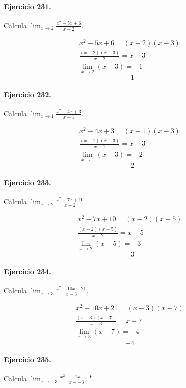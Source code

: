 \documentclass[11pt,a4paper]{article}
\begin{document}
\paragraph{Ejercicio 231.} Calcula $\displaystyle\lim_{x\to 2}\frac{x^2-5x+6}{x-2}$. 

\[
\begin{aligned}
x^2-5x+6=(x-2)(x-3)\\
\frac{(x-2)(x-3)}{x-2}=x-3\\
\lim_{x\to 2}(x-3)=-1
\end{aligned}
\]
\[\boxed{-1}\]


\paragraph{Ejercicio 232.} Calcula $\displaystyle\lim_{x\to 1}\frac{x^2-4x+3}{x-1}$. 

\[
\begin{aligned}
x^2-4x+3=(x-1)(x-3)\\
\frac{(x-1)(x-3)}{x-1}=x-3\\
\lim_{x\to 1}(x-3)=-2
\end{aligned}
\]
\[\boxed{-2}\]


\paragraph{Ejercicio 233.} Calcula $\displaystyle\lim_{x\to 2}\frac{x^2-7x+10}{x-2}$. 

\[
\begin{aligned}
x^2-7x+10=(x-2)(x-5)\\
\frac{(x-2)(x-5)}{x-2}=x-5\\
\lim_{x\to 2}(x-5)=-3
\end{aligned}
\]
\[\boxed{-3}\]


\paragraph{Ejercicio 234.} Calcula $\displaystyle\lim_{x\to 3}\frac{x^2-10x+21}{x-3}$. 

\[
\begin{aligned}
x^2-10x+21=(x-3)(x-7)\\
\frac{(x-3)(x-7)}{x-3}=x-7\\
\lim_{x\to 3}(x-7)=-4
\end{aligned}
\]
\[\boxed{-4}\]


\paragraph{Ejercicio 235.} Calcula $\displaystyle\lim_{x\to -3}\frac{x^2--1x+-6}{x--3}$. 
\end{document}
